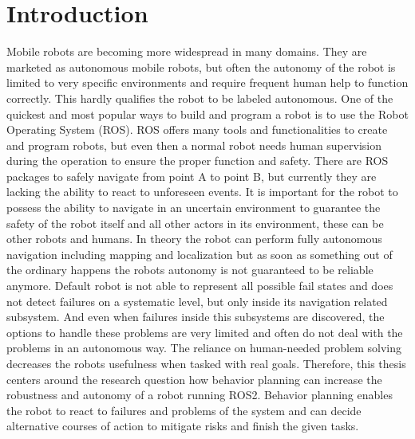 \chapter{Introduction}
\label{cha:introduction}

Mobile robots are becoming more widespread in many domains. They are marketed as autonomous mobile robots, but often the autonomy of the robot is limited to very specific environments and require frequent human help to function correctly. This hardly qualifies the robot to be labeled autonomous. 
One of the quickest and most popular ways to build and program a robot is to use the Robot Operating System (ROS). ROS offers many tools and functionalities to create and program robots, but even then a normal robot needs human supervision during the operation to ensure the proper function and safety. 
There are ROS packages to safely navigate from point A to point B, but currently they are lacking the ability to react to unforeseen events. It is important for the robot to possess the ability to navigate in an uncertain environment to guarantee the safety of the robot itself and all other actors in its environment, these can be other robots and humans. 
In theory the robot can perform fully autonomous navigation including mapping and localization but as soon as something out of the ordinary happens the robots autonomy is not guaranteed to be reliable anymore. 
Default robot is not able to represent all possible fail states and does not detect failures on a systematic level, but only inside its navigation related subsystem. And even when failures inside this subsystems are discovered, the options to handle these problems are very limited and often do not deal with the problems in an autonomous way. The reliance on human-needed problem solving decreases the robots usefulness when tasked with real goals. 
Therefore, this thesis centers around the research question how behavior planning can increase the robustness and autonomy of a robot running ROS2. 
Behavior planning enables the robot to react to failures and problems of the system and can decide alternative courses of action to mitigate risks and finish the given tasks.

%
%
%
%
%
%
%
%

